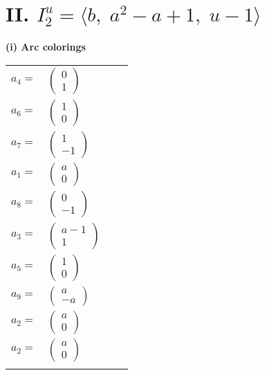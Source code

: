 \documentclass[1p]{elsarticle_modified}
\theoremstyle{definition}
\begin{document}
\centering \section*{II. $I^u_{2}= \langle b,\;a^2- a+1,\;u-1 \rangle$}
\flushleft \textbf{(i) Arc colorings}\\
\begin{tabular}{m{7pt} m{180pt} m{7pt} m{180pt} }
\flushright $a_{4}=$&$\begin{pmatrix}0\\1\end{pmatrix}$ \\
\flushright $a_{6}=$&$\begin{pmatrix}1\\0\end{pmatrix}$ \\
\flushright $a_{7}=$&$\begin{pmatrix}1\\-1\end{pmatrix}$ \\
\flushright $a_{1}=$&$\begin{pmatrix}a\\0\end{pmatrix}$ \\
\flushright $a_{8}=$&$\begin{pmatrix}0\\-1\end{pmatrix}$ \\
\flushright $a_{3}=$&$\begin{pmatrix}a-1\\1\end{pmatrix}$ \\
\flushright $a_{5}=$&$\begin{pmatrix}1\\0\end{pmatrix}$ \\
\flushright $a_{9}=$&$\begin{pmatrix}a\\- a\end{pmatrix}$ \\
\flushright $a_{2}=$&$\begin{pmatrix}a\\0\end{pmatrix}$\\ \flushright $a_{2}=$&$\begin{pmatrix}a\\0\end{pmatrix}$\\&\end{tabular}
\end{document}
